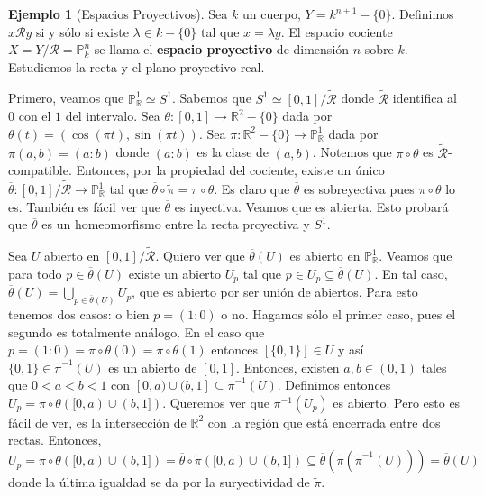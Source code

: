 \documentclass[12pt]{book}
\theoremstyle{definition}
\newtheorem{ex}[teo]{Ejemplo}
\newcommand{\RR}{\mathbb{R}}      %
\newcommand{\Rel}{\mathscr{R}}
\begin{document}
\begin{ex}[Espacios Proyectivos]
Sea $k$ un cuerpo, $Y=k^{n+1}-\{0\}$. Definimos $x\Rel y$ si y sólo si existe $\lambda\in k-\{0\}$ tal que $x=\lambda y$. El espacio cociente $X=Y/\Rel = \mathbb{P}^n_{k}$ se llama el \textbf{espacio proyectivo} de dimensión $n$ sobre $k$. Estudiemos la recta y el plano proyectivo real.

Primero, veamos que $\mathbb{P}^1_{\RR}\simeq S^1$. Sabemos que $S^1 \simeq [0,1]/\tilde{\Rel}$ donde $\tilde{\Rel}$ identifica al $0$ con el $1$ del intervalo. Sea $\theta:[0,1]\to \RR^2 - \{0\}$ dada por $\theta(t)=(\cos(\pi t),\sin (\pi t))$. Sea $\pi :\RR^2-\{0\}\to\mathbb{P}^1_\RR$ dada por $\pi(a,b) = (a:b)$ donde $(a:b)$ es la clase de $(a,b)$. Notemos que $\pi\circ\theta$ es $\tilde{\Rel}$-compatible. Entonces, por la propiedad del cociente, existe un único $\overline{\theta}:[0,1]/\tilde{\Rel}\to \mathbb{P}_\RR^1$ tal que $\overline{\theta}\circ\tilde{\pi} = \pi\circ\theta$. Es claro que $\overline{\theta}$ es sobreyectiva pues $\pi\circ\theta$ lo es. También es fácil ver que $\overline{\theta}$ es inyectiva. Veamos que es abierta. Esto probará que $\overline{\theta}$ es un homeomorfismo entre la recta proyectiva y $S^1$.

Sea $U$ abierto en $[0,1]/\tilde{\Rel}$. Quiero ver que $\overline{\theta}(U)$ es abierto en $\mathbb{P}_\RR^1$. Veamos que para todo $p\in \overline{\theta}(U)$ existe un abierto $U_p$ tal que $p\in U_p \subseteq \overline{\theta}(U)$. En tal caso, $\overline{\theta}(U)=\displaystyle\bigcup_{p\in\overline{\theta}(U)}U_p$, que es abierto por ser unión de abiertos. Para esto tenemos dos casos: o bien $p=(1:0)$ o no. Hagamos sólo el primer caso, pues el segundo es totalmente análogo. En el caso que $p=(1:0) = \pi\circ\theta(0)=\pi\circ\theta(1)$ entonces $[\{0,1\}]\in U$ y así $\{0,1\}\in\tilde{\pi}^{-1}(U)$ es un abierto de $[0,1]$. Entonces, existen $a,b\in (0,1)$ tales que $0<a<b<1$ con $[0,a)\cup (b,1]\subseteq \tilde{\pi}^{-1}(U)$. Definimos entonces $U_p = \pi\circ\theta( [0,a)\cup (b,1])$. Queremos ver que $\pi^{-1}(U_p)$ es abierto. Pero esto es fácil de ver, es la intersección de $\RR^2$ con la región que está encerrada entre dos rectas. Entonces, $U_p = \pi\circ\theta([0,a)\cup (b,1]) = \overline{\theta}\circ\tilde{\pi}([0,a)\cup(b,1]) \subseteq \overline{\theta}(\tilde{\pi}(\tilde{\pi}^{-1}(U))) = \overline{\theta}(U)$ donde la última igualdad se da por la suryectividad de $\tilde{\pi}$.


\end{ex}
\end{document}
